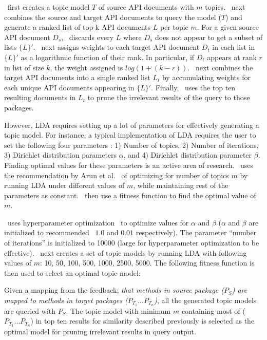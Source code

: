 \tool\ first creates a topic model $T$ of source API documents with $m$ topics.
\tool\ next combines the source and target API documents to query the model ($T$) and generate a ranked list of top-k API documents $L$ per topic $m$.
For a given source API document $D_s$, \tool\ discards every $L$ where $D_s$ does not appear to get a subset of lists $\{L\}'$.
\tool\ next assigns weights to each target API document $D_t$ in each list in $\{L\}'$ as a logarithmic function of their rank. 
In particular, if $D_t$ appears at rank $r$ in list of size $k$, the weight assigned is $log(1+ (k-r))$.
\tool\ next combines the target API documents into a single ranked list $L_t$ by accumulating weights for each unique API documents appearing in $\{L\}'$. 
Finally, \tool\ uses the top ten resulting documents in $L_t$ to prune the irrelevant results of the query to those packages.


However, LDA requires setting up a lot of parameters for effectively generating a topic model.
For instance, a typical implementation of LDA requires the user to set the following four parameters : 1) Number of topics, 2) Number of iterations, 3) Dirichlet distribution parameters $\alpha$, and 4) Dirichlet distribution parameter $\beta$.
Finding optimal values for these parameters is an active area of research.
\tool\ uses the recommendation by Arun et al.~\cite{arun2010finding} of optimizing for number of topics $m$ by running LDA under different values of $m$, while maintaining rest of the parameters as constant.
\tool\ then use a fitness function to find the optimal value of $m$.


\tool\ uses hyperparameter optimization~\cite{McCallum} to optimize values for $\alpha$ and $\beta$ ($\alpha$ and $\beta$ are initialized to recommended~\cite{McCallum} $1.0$ and $0.01$ respectively).
The parameter ``number of iterations'' is initialized to 10000 (large for hyperparameter optimization to be effective).
\tool\ next creates a set of topic models by running LDA with following values of $m$: 10, 50, 100, 500, 1000, 2500, 5000.
The following fitness function is then used to select an optimal topic model:

Given a mapping from the feedback; \textit{that methods in source package ($P_S$) are mapped to methods in target packages ($P_{T_1}...P_{T_n}$)}, all the generated topic models are queried with $P_S$.
The topic model with minimum $m$ containing most of ($P_{T_1}...P_{T_n}$) in top ten results for similarity described previously is selected as the optimal model for pruning irrelevant results in query output. 

